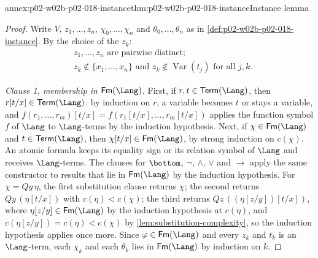 \begin{annexitem}{annex:p02-w02b-p02-018-instance}{thm:p02-w02b-p02-018-instance}{Instance lemma}
\begin{proof}
Write \(V\), \(z_1,\ldots,z_n\), \(\chi_0,\ldots,\chi_n\) and
\(\theta_0,\ldots,\theta_n\) as in
\cref{def:p02-w02b-p02-018-instance}.  By the choice of the \(z_k\):
\begin{equation*}
 \begin{aligned}
  &z_1,\ldots,z_n\text{ are pairwise distinct};\\
  &z_k\notin\{x_1,\ldots,x_n\}\text{ and }
   z_k\notin\operatorname{Var}(t_j)\text{ for all }j,k.
 \end{aligned}
 \tag{\(\dagger\)}
\end{equation*}

\emph{Clause 1, membership in \(\mathsf{Fm}(\Lang)\).}  First, if
\(r,t\in\mathsf{Term}(\Lang)\), then \(r[t/x]\in\mathsf{Term}(\Lang)\): by
induction on \(r\), a variable becomes \(t\) or stays a variable, and
\(f(r_1,\ldots,r_m)[t/x]=f(r_1[t/x],\ldots,r_m[t/x])\) applies the function
symbol \(f\) of \(\Lang\) to \(\Lang\)-terms by the induction hypothesis.
Next, if \(\chi\in\mathsf{Fm}(\Lang)\) and \(t\in\mathsf{Term}(\Lang)\), then
\(\chi[t/x]\in\mathsf{Fm}(\Lang)\), by strong induction on \(c(\chi)\).  An
atomic formula keeps its equality sign or its relation symbol of \(\Lang\)
and receives \(\Lang\)-terms.  The clauses for \(\bottom\),
\(\neg\), \(\land\), \(\lor\) and \(\to\) apply the same constructor to
results that lie in \(\mathsf{Fm}(\Lang)\) by the induction hypothesis.  For
\(\chi=Qy\,\eta\), the first substitution clause returns \(\chi\); the
second returns \(Qy\,(\eta[t/x])\) with \(c(\eta)<c(\chi)\); the third
returns \(Qz\,((\eta[z/y])[t/x])\), where \(\eta[z/y]\in\mathsf{Fm}(\Lang)\)
by the induction hypothesis at \(c(\eta)\), and
\(c(\eta[z/y])=c(\eta)<c(\chi)\) by \cref{lem:substitution-complexity}, so
the induction hypothesis applies once more.  Since \(\varphi\in\mathsf{Fm}(\Lang)\)
and every \(z_k\) and \(t_k\) is an \(\Lang\)-term, each \(\chi_k\) and each
\(\theta_k\) lies in \(\mathsf{Fm}(\Lang)\) by induction on \(k\).


\end{proof}
\end{annexitem}
